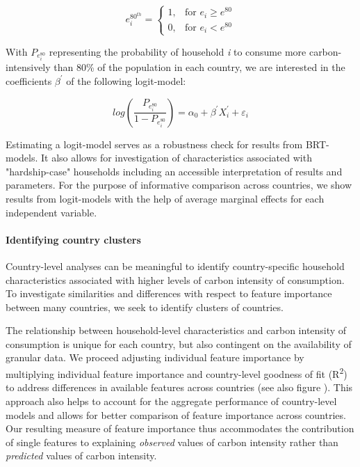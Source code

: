 \documentclass[12pt, a4paper]{article}
\begin{document}
\begin{equation}\label{eq:logit}
    e_{i}^{80^{th}} =
    \begin{cases}
    1, & \text{for }  e_{i} \geq e^{80} \\
    0, & \text{for }  e_{i} < e^{80}
    \end{cases}
\end{equation}

With $P_{e_{i}^{80}}$ representing the probability of household \textit{i} to consume more carbon-intensively than 80\% of the population in each country, we are interested in the coefficients $\beta^{'}$ of the following logit-model:

\begin{equation} \label{logit}
    log \left( \frac{P_{e_{i}^{80}}}{1 - P_{e_{i}^{80}}} \right) = \alpha_{0} + \beta^{'} X_{i}^{'} + \varepsilon_{i}
\end{equation}

Estimating a logit-model serves as a robustness check for results from BRT-models. It also allows for investigation of characteristics associated with "hardship-case" households including an accessible interpretation of results and parameters. For the purpose of informative comparison across countries, we show results from logit-models with the help of average marginal effects for each independent variable.

\paragraph{Identifying country clusters} Country-level analyses can be meaningful to identify country-specific household characteristics associated with higher levels of carbon intensity of consumption. To investigate similarities and differences with respect to feature importance between many countries, we seek to identify clusters of countries. 

The relationship between household-level characteristics and carbon intensity of consumption is unique for each country, but also contingent on the availability of granular data. We proceed adjusting individual feature importance by multiplying individual feature importance and country-level goodness of fit (R\textsuperscript{2}) to address differences in available features across countries (see also figure ). This approach also helps to account for the aggregate performance of country-level models and allows for better comparison of feature importance across countries. Our resulting measure of feature importance thus accommodates the contribution of single features to explaining \textit{observed} values of carbon intensity rather than \textit{predicted} values of carbon intensity.
\end{document}
